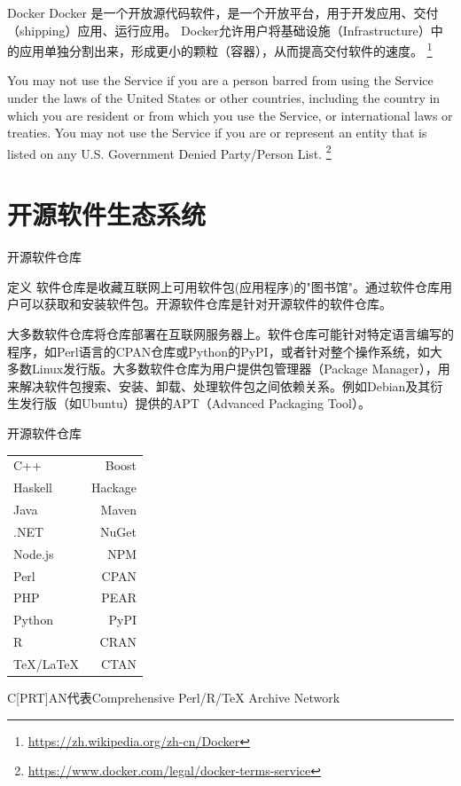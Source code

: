 \documentclass{beamer}
\begin{document}
	\begin{frame}[t]{Docker}
	Docker 是一个开放源代码软件，是一个开放平台，用于开发应用、交付（shipping）应用、运行应用。 Docker允许用户将基础设施（Infrastructure）中的应用单独分割出来，形成更小的颗粒（容器），从而提高交付软件的速度。	{\scriptsize{\footnote{\url{https://zh.wikipedia.org/zh-cn/Docker}}}}

	You may not use the Service if you are a person barred from using the Service under the laws of the United States or other countries, including the country in which you are resident or from which you use the Service, or international laws or treaties. You may not use the Service if you are or represent an entity that is listed on any U.S. Government Denied Party/Person List. {\scriptsize{\footnote{\url{https://www.docker.com/legal/docker-terms-service}}}}


	\end{frame}
	
\section{开源软件生态系统} %
\label{sec:开源软件生态系统}
\begin{frame}[t]{开源软件仓库}
    \begin{block}
        {定义}
    软件仓库是收藏互联网上可用软件包(应用程序)的"图书馆"。通过软件仓库用户可以获取和安装软件包。开源软件仓库是针对开源软件的软件仓库。

    大多数软件仓库将仓库部署在互联网服务器上。软件仓库可能针对特定语言编写的程序，如Perl语言的CPAN仓库或Python的PyPI，或者针对整个操作系统，如大多数Linux发行版。大多数软件仓库为用户提供包管理器（Package Manager），用来解决软件包搜索、安装、卸载、处理软件包之间依赖关系。例如Debian及其衍生发行版（如Ubuntu）提供的APT（Advanced Packaging Tool）。
    \end{block}
\end{frame}
\begin{frame}[t]{开源软件仓库}
    
\begin{tabular}{lr}
C++      		 & Boost   \\
Haskell  		 & Hackage\\
Java     		 & Maven\\
.NET     	     & NuGet\\
Node.js  		 & NPM\\
Perl     		 & CPAN\\
PHP      	     & PEAR \\
Python   	     & PyPI\\
R        	     & CRAN\\
\TeX{}/\LaTeX{}	 & CTAN\\

\end{tabular}

\pause
\begin{block}
    {}
C[PRT]AN代表Comprehensive Perl/R/\TeX{} Archive Network
\end{block}
\end{frame}
\end{document}
